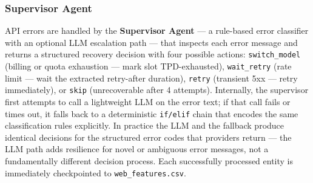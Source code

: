 \subsubsection*{Supervisor Agent}
\label{sec:supervisor}

API errors are handled by the \textbf{Supervisor Agent} --- a rule-based error
classifier with an optional LLM escalation path --- that inspects each error message
and returns a structured recovery decision
with four possible actions: \texttt{switch\_model} (billing or quota exhaustion ---
mark slot TPD-exhausted), \texttt{wait\_retry} (rate limit --- wait the extracted
retry-after duration), \texttt{retry} (transient 5xx --- retry immediately), or
\texttt{skip} (unrecoverable after 4 attempts). Internally, the supervisor first
attempts to call a lightweight LLM on the error text; if that call fails or times
out, it falls back to a deterministic \texttt{if/elif} chain that encodes the same
classification rules explicitly. In practice the LLM and the fallback produce
identical decisions for the structured error codes that providers return --- the LLM
path adds resilience for novel or ambiguous error messages, not a fundamentally
different decision process. Each successfully processed entity is immediately
checkpointed to \texttt{web\_features.csv}.

